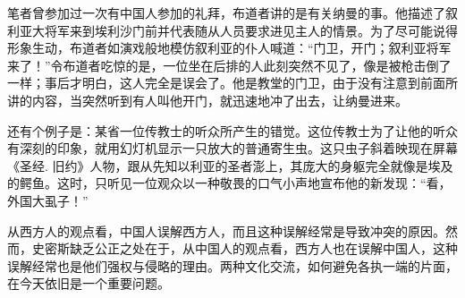\documentclass[12pt,oneside]{book}
\begin{document}
\begin{common-format}
笔者曾参加过一次有中国人参加的礼拜，布道者讲的是有关纳曼的事。他描述了叙利亚大将军来到埃利沙门前并代表随从人员要求进见主人的情景。为了尽可能说得形象生动，布道者如演戏般地模仿叙利亚的仆人喊道：“门卫，开门；叙利亚将军来了！”令布道者吃惊的是，一位坐在后排的人此刻突然不见了，像是被枪击倒了一样；事后才明白，这人完全是误会了。他是教堂的门卫，由于没有注意到前面所讲的内容，当突然听到有人叫他开门，就迅速地冲了出去，让纳曼进来。 

还有个例子是：某省一位传教士的听众所产生的错觉。这位传教士为了让他的听众有深刻的印象，就用幻灯机显示一只放大的普通寄生虫。这只虫子斜着映现在屏幕《圣经. 旧约》人物，跟从先知以利亚的圣者澎上，其庞大的身躯完全就像是埃及的鳄鱼。这时，只听见一位观众以一种敬畏的口气小声地宣布他的新发现：“看，外国大虱子！” 

从西方人的观点看，中国人误解西方人，而且这种误解经常是导致冲突的原因。然而，史密斯缺乏公正之处在于，从中国人的观点看，西方人也在误解中国人，这种误解经常也是他们强权与侵略的理由。两种文化交流，如何避免各执一端的片面，在今天依旧是一个重要问题。




\end{common-format}
\end{document}
